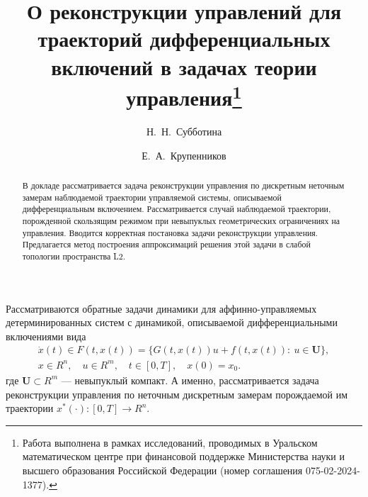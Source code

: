 \fi

\title{О реконструкции управлений для траекторий дифференциальных включений в задачах теории управления\thanks{Работа выполнена в рамках исследований, проводимых в Уральском математическом центре при финансовой поддержке Министерства науки и высшего образования Российской Федерации (номер соглашения 075-02-2024-1377).}}
\author{Н.~Н.~Субботина \and  Е.~А.~Крупенников
  \and
}


\maketitle

\begin{abstract}
В докладе рассматривается задача реконструкции управления по дискретным неточным замерам наблюдаемой траектории управляемой системы, описываемой дифференциальным включением.
Рассматривается случай наблюдаемой траектории, порожденной скользящим
режимом при невыпуклых геометрических ограничениях на управления. Вводится корректная постановка задачи реконструкции управления. Предлагается метод построения аппроксимаций решения этой задачи в слабой топологии пространства L2.

\end{abstract}


Рассматриваются обратные задачи динамики для аффинно-управляемых
детерминированных систем с динамикой, описываемой дифференциальными включениями вида
\begin{equation}\label{Krupennikov:dyn}
\begin{gathered}
\dot x(t)\in F(t,x(t))=\{G(t,x(t))u + f(t,x(t)):\ u\in \mathbf{U}\},\\
x\in R^n,\quad u\in R^m,\quad t\in[0,T],\quad x(0)=x_0.
\end{gathered}
\end{equation}
где $\mathbf{U}\subset R^m$ --- невыпуклый компакт. А именно, рассматривается задача реконструкции управления по неточным дискретным замерам порождаемой
им траектории $x^*(\cdot):[0,T]\to R^n$.

